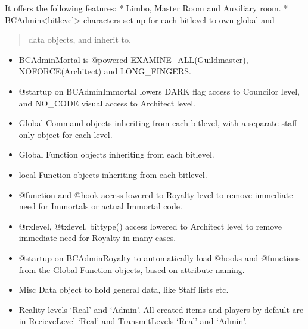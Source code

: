 \documentclass[letterpaper,10pt,english]{sphinxmanual}
\begin{document}
\sphinxAtStartPar
It offers the following features:
* Limbo, Master Room and Auxiliary room.
* BC\sphinxhyphen{}Admin\sphinxhyphen{}\textless{}bitlevel\textgreater{} characters set up for each bitlevel to own global and
\begin{quote}

\sphinxAtStartPar
data objects, and inherit to.
\end{quote}
\begin{itemize}
\item {} 
\sphinxAtStartPar
BC\sphinxhyphen{}Admin\sphinxhyphen{}Mortal is @powered EXAMINE\_ALL(Guildmaster), NOFORCE(Architect) and
LONG\_FINGERS.

\item {} 
\sphinxAtStartPar
@startup on BC\sphinxhyphen{}Admin\sphinxhyphen{}Immortal lowers DARK flag access to Councilor level, and
NO\_CODE visual access to Architect level.

\item {} 
\sphinxAtStartPar
Global Command objects inheriting from each bitlevel, with a separate staff\sphinxhyphen{}
\sphinxhyphen{}only object for each level.

\item {} 
\sphinxAtStartPar
Global Function objects inheriting from each bitlevel.

\item {} 
\sphinxAtStartPar
local Function objects inheriting from each bitlevel.

\item {} 
\sphinxAtStartPar
@function and @hook access lowered to Royalty level to remove immediate need
for Immortals or actual Immortal code.

\item {} 
\sphinxAtStartPar
@rxlevel, @txlevel, bittype() access lowered to Architect level to remove
immediate need for Royalty in many cases.

\item {} 
\sphinxAtStartPar
@startup on BC\sphinxhyphen{}Admin\sphinxhyphen{}Royalty to automatically load @hooks and @functions from
the Global Function objects, based on attribute naming.

\item {} 
\sphinxAtStartPar
Misc Data object to hold general data, like Staff lists etc.

\item {} 
\sphinxAtStartPar
Reality levels ‘Real’ and ‘Admin’.
All created items and players by default are in Recieve\sphinxhyphen{}Level ‘Real’ and
Transmit\sphinxhyphen{}Levels ‘Real’ and ‘Admin’.


\end{itemize}
\end{document}
